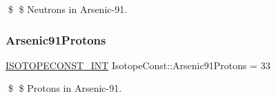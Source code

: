 \$ \$ Neutrons in Arsenic-\/91. \mbox{\label{group___isotope_const-_arsenic-_as91_ga51cfcbad0698bd5255a2a4083024ff1e}} 
\subsubsection{\texorpdfstring{Arsenic91\+Protons}{Arsenic91Protons}}
{\footnotesize\ttfamily \mbox{\hyperlink{group___isotope_const-_macros_ga5f18360b3e99483a35c32d789e62621c}{I\+S\+O\+T\+O\+P\+E\+C\+O\+N\+S\+T\+\_\+\+I\+NT}} Isotope\+Const\+::\+Arsenic91\+Protons = 33}

\$ \$ Protons in Arsenic-\/91. 